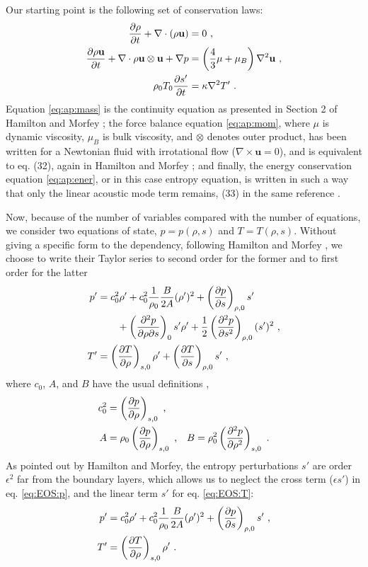 Our starting point is the following set of conservation laws:
\begin{align} 
  \label{eq:ap:mass}
  \frac{\partial \rho}{\partial t} + \nabla \cdot
  \left(\rho \mathbf{u}\right)& = 0 
  \ \text{,} \\ 
  \label{eq:ap:mom}
  \frac{\partial \rho \mathbf{u}}{\partial t} +
  \nabla\cdot\rho\mathbf{u}\otimes\mathbf{u}
  + \nabla p 
  & = 
  \left(\frac{4}{3}\mu + \mu_B\right)\nabla^2\mathbf{u}
  \ \text{,} \\ 
  \label{eq:ap:ener}
  \rho_0 T_0 \frac{\partial s'}{\partial t} &= \kappa \nabla^2 T'
  \ \text{.}
\end{align}
Equation \eqref{eq:ap:mass} is the continuity equation as presented in Section 2 of Hamilton and Morfey \citep{hamilton1998model}; 
the force balance equation \eqref{eq:ap:mom}, where $\mu$ is dynamic viscosity, $\mu_B$ is bulk viscosity, and $\otimes$ denotes outer product, has been written for a Newtonian fluid with irrotational flow ($\nabla\times\mathbf{u}=0$), and is equivalent to eq. (32), again in Hamilton and Morfey \citep{hamilton1998model}; 
and finally, the energy conservation equation \eqref{eq:ap:ener}, or in this case entropy equation, is written in such a way that only the linear acoustic mode term remains, (33) in the same reference \citep{hamilton1998model}.

Now, because of the number of variables compared with the number of equations, we consider two equations of state, $p=p(\rho,s)$ and $T=T(\rho,s)$.
Without giving a specific form to the dependency, following Hamilton and Morfey \citep{hamilton1998model}, we choose to write their Taylor series to second order for the former and to first order for the latter
\begin{align*}
  p' &= 
  c_0^2 \rho' + c_0^2 \frac{1}{\rho_0} \frac{B}{2A}(\rho')^2 +
  \left(\frac{\partial p}{\partial s}\right)_{\rho,0} s' \\
  & \qquad
  + \left(\frac{\partial ^2 p}{\partial \rho\partial s}\right)_0 s' \rho'
  + \frac{1}{2} \left(\frac{\partial ^2 p}{\partial s^2}\right)_{\rho,0} (s')^2
  \ \text{,} \\  
  T' &= \left(\frac{\partial T}{\partial \rho}\right)_{s,0} \rho'
  + \left(\frac{\partial T}{\partial s}\right)_{\rho,0} s'
  \ \text{,}
\end{align*}
where $c_0$, $A$, and $B$ have the usual definitions \citep{beyer},
\begin{align}
  c_0^2 &= \left(\frac{\partial p}{\partial \rho}\right)_{s,0} 
  \ \text{,} \\
  A &= \rho_0 \left(\frac{\partial p}{\partial \rho}\right)_{s,0} 
  \ \text{,} \quad
  B = \rho_0^2 \left(\frac{\partial ^2p}{\partial \rho^2}\right)_{s,0} 
  \ \text{.} 
\end{align}
As pointed out by Hamilton and Morfey, the entropy perturbations $s'$ are order $\epsilon^2$ far from the boundary layers, which allows us to neglect the cross term ($\epsilon s'$) in eq. \eqref{eq:EOS:p}, and the linear term $s'$ for eq. \eqref{eq:EOS:T}:
\begin{align}
  \label{eq:EOS:p}
  p' &= 
  c_0^2 \rho' + c_0^2 \frac{1}{\rho_0} \frac{B}{2A}(\rho')^2 +
  \left(\frac{\partial p}{\partial s}\right)_{\rho,0} s' 
  \ \text{,} \\  
  \label{eq:EOS:T}
  T' &= \left(\frac{\partial T}{\partial \rho}\right)_{s,0} \rho'
  \ \text{.}
\end{align}

